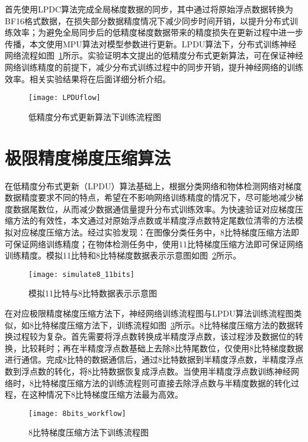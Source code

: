 首先使用LPDC算法完成全局梯度数据的同步，其中通过将原始浮点数据转换为BF16格式数据，在损失部分数据精度情况下减少同步时间开销，以提升分布式训练效率；为避免全局同步后的低精度梯度数据带来的精度损失在更新过程中进一步传播，本文使用MPU算法对模型参数进行更新。LPDU算法下，分布式训练神经网络流程如图~\ref{fig:LPDUflow}所示。实验证明本文提出的低精度分布式更新算法，可在保证神经网络训练精度的前提下，减少分布式训练过程中的同步开销，提升神经网络的训练效率。相关实验结果将在后面详细分析介绍。

\begin{figure}[htp]
\centering
\texttt{[image: LPDUflow]}
\caption{低精度分布式更新算法下训练流程图}
\label{fig:LPDUflow}
\end{figure}

\section{极限精度梯度压缩算法}
在低精度分布式更新（LPDU）算法基础上，根据分类网络和物体检测网络对梯度数据精度要求不同的特点，希望在不影响网络训练精度的情况下，尽可能地减少梯度数据尾数位，从而减少数据通信量提升分布式训练效率。为快速验证对应梯度压缩方法的有效性，本文通过对原始浮点数或半精度浮点数特定尾数位清零的方法模拟对应梯度压缩方法。经过实验发现：在图像分类任务中，8比特梯度压缩方法即可保证网络训练精度；在物体检测任务中，使用11比特梯度压缩方法即可保证网络训练精度。模拟11比特和8比特梯度数据表示示意图如图~\ref{fig:simulate8_11bits}所示。

\begin{figure}[htp]
\centering
\texttt{[image: simulate8\_11bits]}
\caption{模拟11比特与8比特数据表示示意图}
\label{fig:simulate8_11bits}
\end{figure}

在对应极限精度梯度压缩方法下，神经网络训练流程图与LPDU算法训练流程图类似，如8比特梯度压缩方法下，训练流程如图~\ref{fig:8bits_workflow}所示。8比特梯度压缩方法的数据转换过程较为复杂。首先需要将浮点数转换成半精度浮点数，该过程涉及数据位的转换，比较耗时；再在半精度浮点数基础上去除8比特尾数位，仅使用8比特梯度数据进行通信。完成8比特的数据通信后，通过8比特数据到半精度浮点数，半精度浮点数到浮点数的转化，将8比特数据恢复成浮点数。当使用半精度浮点数训练神经网络时，8比特梯度压缩方法的训练流程则可直接去除浮点数与半精度数据的转化过程，在这种情况下8比特梯度压缩方法最为高效。
\begin{figure}[htp]
\centering
\texttt{[image: 8bits\_workflow]}
\caption{8比特梯度压缩方法下训练流程图}
\label{fig:8bits_workflow}
\end{figure}



